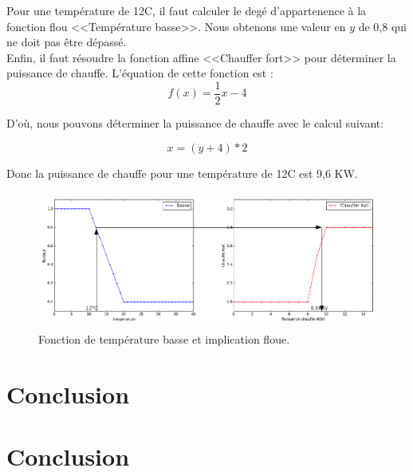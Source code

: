\documentclass[a4paper,11pt]{article}
\begin{document}
Pour une température de 12\degre C, il faut calculer le degé 
d'appartenence à la fonction flou <<Température basse>>. Nous 
obtenons une valeur en $y$ de 0,8 qui ne doit pas être dépassé.\\

Enfin, il faut résoudre la fonction affine <<Chauffer fort>> pour 
déterminer la puissance de chauffe. L'équation de cette fonction 
est :
$$
f(x)=\frac{1}{2}x-4
$$

D'où, nous pouvons déterminer la puissance de chauffe avec le 
calcul suivant:

$$
x = (y+4) * 2
$$

Donc la puissance de chauffe pour une température de 12\degre C 
est 9,6 KW.

\begin{figure}[H]
  \begin{center}
  \includegraphics[height=170px]{images/low_mamdani_arrow.png}
  \caption{Fonction de température basse et implication floue.}
  \end{center}
\end{figure}



\section*{Conclusion}

\newpage





\section*{Conclusion}
\end{document}
